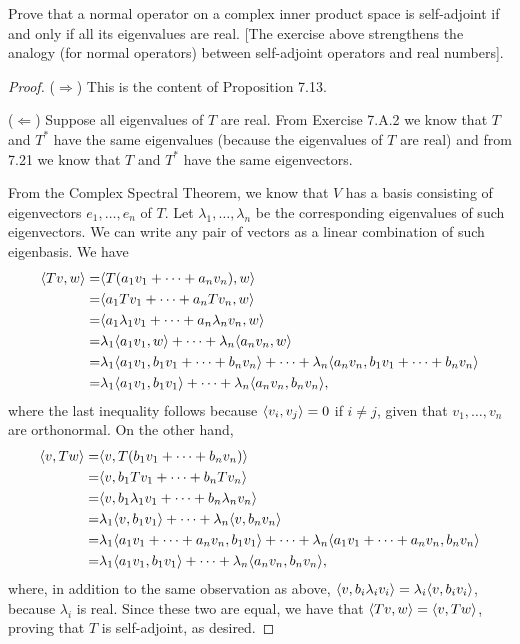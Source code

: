 \begin{exercise}{6}
  Prove that a normal operator on a complex inner product space is self-adjoint if and only if all its eigenvalues are real. [The exercise above strengthens the analogy (for normal operators) between self-adjoint operators and real numbers].
\end{exercise}
\begin{proof}
 ($\Rightarrow$) This is the content of Proposition 7.13.

 ($\Leftarrow$) Suppose all eigenvalues of $T$ are real. From Exercise 7.A.2 we know that $T$ and $T^\ast$ have the same eigenvalues (because the eigenvalues of $T$ are real) and from 7.21 we know that $T$ and $T^\ast$ have the same eigenvectors. 
 
 From the Complex Spectral Theorem, we know that $V$ has a basis consisting of eigenvectors $e_1,\dots,e_n$ of $T$. Let $\lambda_1,\dots,\lambda_n$ be the corresponding eigenvalues of such eigenvectors. We can write any pair of vectors as a linear combination of such eigenbasis. We have
 \begin{align*}
     \langle Tv,w\rangle =& \langle T(a_1v_1+\dots+a_nv_n), w\rangle\\
     =& \langle a_1Tv_1+\dots+a_nTv_n, w\rangle\\
     =& \langle a_1\lambda_1v_1+\dots+a_n\lambda_nv_n,w\rangle\\
     =& \lambda_1\langle a_1v_1,w\rangle+\dots+\lambda_n\langle a_nv_n,w\rangle\\
     =& \lambda_1\langle a_1v_1,b_1v_1+\dots+b_nv_n\rangle+\dots+\lambda_n\langle a_nv_n,b_1v_1+\dots+b_nv_n\rangle\\
     =& \lambda_1\langle a_1v_1,b_1v_1\rangle+\dots+\lambda_n\langle a_nv_n,b_nv_n\rangle,
 \end{align*}
 where the last inequality follows because $\langle v_i,v_j\rangle=0$ if $i\neq j$, given that $v_1,\dots,v_n$ are orthonormal. On the other hand,
 \begin{align*}
    \langle v,Tw\rangle =& \langle v,T(b_1v_1+\dots+b_nv_n)\rangle\\
    =& \langle v,b_1Tv_1+\dots+b_nTv_n\rangle\\
    =& \langle v,b_1\lambda_1v_1+\dots+b_n\lambda_nv_n\rangle\\
    =& \lambda_1\langle v,b_1v_1\rangle+\dots+\lambda_n\langle v,b_nv_n\rangle\\
    =& \lambda_1\langle a_1v_1+\dots+a_nv_n,b_1v_1\rangle+\dots+\lambda_n\langle a_1v_1+\dots+a_nv_n,b_nv_n\rangle\\
    =& \lambda_1\langle a_1v_1,b_1v_1\rangle+\dots+\lambda_n\langle a_nv_n,b_nv_n\rangle,
 \end{align*}
 where, in addition to the same observation as above, $\langle v,b_i\lambda_iv_i\rangle=\lambda_i\langle v,b_iv_i\rangle$, because $\lambda_i$ is real. Since these two are equal, we have that $\langle Tv,w\rangle=\langle v,Tw\rangle$, proving that $T$ is self-adjoint, as desired.
\end{proof}

